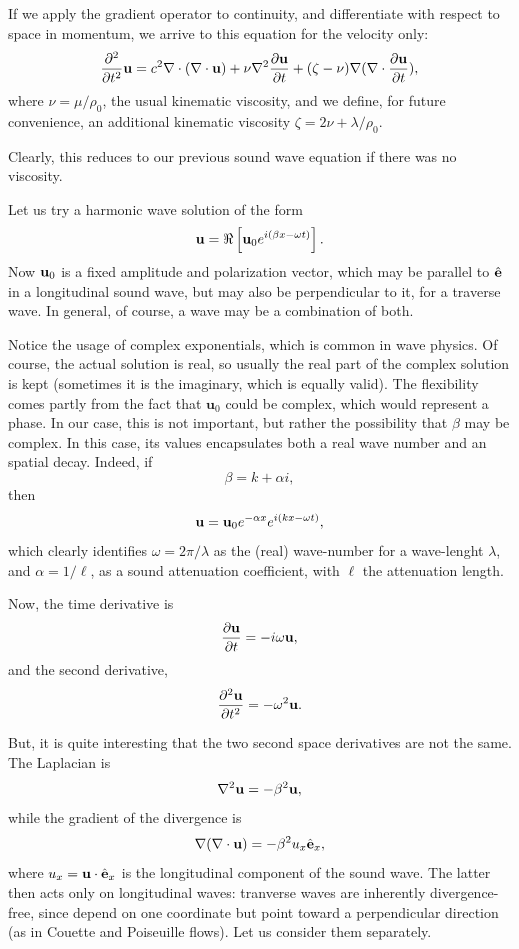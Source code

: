 If we apply the gradient operator to continuity, and differentiate
with respect to space in momentum, we arrive to this equation for
the velocity only:
\begin{equation}
  \label{eq:sound_att_Fourier}
  \frac{\partial^2 }{\partial t^2 } \mathbf{u} =
  c^2\nabla \cdot (\nabla\cdot\mathbf{u}) + \nu \nabla^2\frac{\partial\mathbf{u}}{\partial t} +
  (\zeta - \nu) \nabla (\nabla\cdot \frac{\partial\mathbf{u}}{\partial t} ) ,
\end{equation}
where $\nu=\mu/\rho_0$, the usual kinematic viscosity, and we define,
for future convenience, an additional kinematic viscosity
$\zeta=2 \nu+\lambda/\rho_0$.

Clearly, this reduces to our previous sound wave equation if there was
no viscosity.

Let us try a harmonic wave solution of the form
\begin{equation}
  \label{eq:wave_form_visc}
  \mathbf{u} = \Re\left[ \mathbf{u}_0 e^{i( \beta x - \omega t)} \right].
\end{equation}
Now $\mathbf{u}_0$ is a fixed amplitude and polarization vector, which may
be parallel to $\hat{\mathbf{e}}$ in a longitudinal sound wave, but may also be
perpendicular to it, for a traverse wave. In general, of course, a
wave may be a combination of both.

Notice the usage of complex exponentials, which is common in wave
physics. Of course, the actual solution is real, so usually the real
part of the complex solution is kept (sometimes it is the imaginary,
which is equally valid). The flexibility comes partly from the fact
that $\mathbf{u}_0$ could be complex, which would represent a phase.
In our case, this is not important, but rather the possibility that
$\beta$ may be complex. In this case, its values encapsulates both a
real wave number and an spatial decay. Indeed, if
\[
  \beta = k + \alpha i ,
\]
then
\[
  \mathbf{u} = \mathbf{u}_0e^{- \alpha x} e^{i(k x - \omega t )} ,
\]
which clearly identifies $ \omega=2\pi /\lambda$ as the (real)
wave-number for a wave-lenght $ \lambda$, and $ \alpha=1 /\ell $, as a
sound attenuation coefficient, with $ \ell $ the attenuation length.

Now, the time derivative is
\[
  \frac{\partial \mathbf{u}  }{\partial t }  = -i \omega \mathbf{u} ,
\]
and the second derivative,
\[
  \frac{\partial^2 \mathbf{u}   }{\partial t^2 }  = -\omega^2 \mathbf{u}.
\]

But, it is quite interesting that the two second space derivatives are
not the same. The Laplacian is
\[
\nabla^2 \mathbf{u} = -\beta^2 \mathbf{u},
\]
while the gradient of the divergence is
\[
\nabla (\nabla\cdot \mathbf{u} ) = -\beta^2 u_x \hat{\mathbf{e}}_x,
\]
where $u_x= \mathbf{u}\cdot \hat{\mathbf{e}}_x$ is the longitudinal component of the
sound wave.
%
The latter then acts only on longitudinal waves: tranverse waves are
inherently divergence-free, since depend on one coordinate but point
toward a perpendicular direction (as in Couette and Poiseuille flows).
Let us consider them separately.

